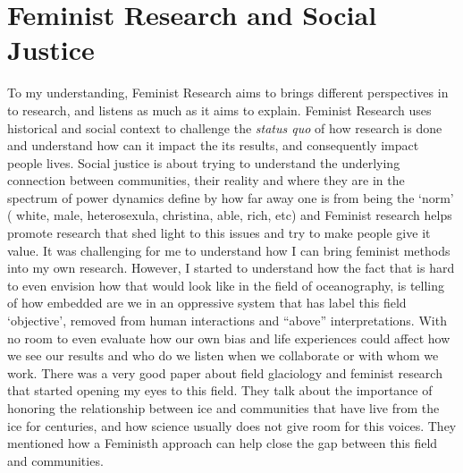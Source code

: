 \documentclass{tufte-handout}
\begin{document}
\section{Feminist Research and Social Justice}\label{sec:installation}

To my understanding, Feminist Research aims to brings different perspectives in to research, and listens as much as it aims to explain. Feminist Research uses historical and social context to challenge the \textit{status quo} of how research is done and understand how can it impact the its results, and consequently impact people lives. Social justice is about trying to understand the underlying connection between communities, their reality and where they are in the spectrum of power dynamics define by how far away one is from being the `norm' ( white, male, heterosexula, christina, able, rich, etc) and Feminist research helps promote research that shed light to this issues and try to make people give it value. It was challenging for me to understand how I can bring feminist methods into my own research. However, I started to understand how the fact that is hard to even envision how that would look like in the field of oceanography, is telling of how embedded are we in an oppressive system that has label this field `objective', removed from human interactions and “above” interpretations. With no room to even evaluate how our own bias and life experiences could affect how we see our results and who do we listen when we collaborate or with whom we work.  There was a very good paper about field glaciology\cite{Carey2016GlaciersScience} and feminist research that started opening my eyes to this field. They talk about the importance of honoring the relationship between ice and communities that have live from the ice for centuries, and how science usually does not give room for this voices. They mentioned how a Feministh approach can help close the gap between this field and communities. 	 


\end{document}
